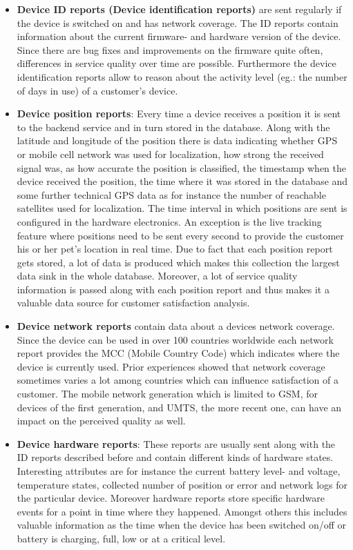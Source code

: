 \begin{itemize}
	\item \textbf{Device ID reports (Device identification reports)} are sent regularly if the device is switched on and has network coverage. The ID reports contain information about the current firmware- and hardware version of the device. Since there are bug fixes and improvements on the firmware quite often, differences in service quality over time are possible. Furthermore the device identification reports allow to reason about the activity level (eg.: the number of days in use) of a customer's device.
	\item \textbf{Device position reports}: Every time a device receives a position it is sent to the backend service and in turn stored in the database. Along with the latitude and longitude of the position there is data indicating whether GPS or mobile cell network was used for localization, how strong the received signal was, as how accurate the position is classified, the timestamp when the device received the position, the time where it was stored in the database and some further technical GPS data as for instance the number of reachable satellites used for localization. The time interval in which positions are sent is configured in the hardware electronics. An exception is the live tracking feature where positions need to be sent every second to provide the customer his or her pet's location in real time. Due to fact that each position report gets stored, a lot of data is produced which makes this collection the largest data sink in the whole database. Moreover, a lot of service quality information is passed along with each position report and thus makes it a valuable data source for customer satisfaction analysis. 
	\item \textbf{Device network reports} contain data about a devices network coverage. Since the device can be used in over 100 countries worldwide each network report provides the MCC (Mobile Country Code) which indicates where the device is currently used. Prior experiences showed that network coverage sometimes varies a lot among countries which can influence satisfaction of a customer. The mobile network generation which is limited to GSM, for devices of the first generation, and UMTS, the more recent one, can have an impact on the perceived quality as well.
	\item \textbf{Device hardware reports}: These reports are usually sent along with the ID reports described before and contain different kinds of hardware states. Interesting attributes are for instance the current battery level- and voltage, temperature states, collected number of position or error and network logs for the particular device. Moreover hardware reports store specific hardware events for a point in time where they happened. Amongst others this includes valuable information as the time when the device has been switched on/off or battery is charging, full, low or at a critical level. 

\end{itemize}
